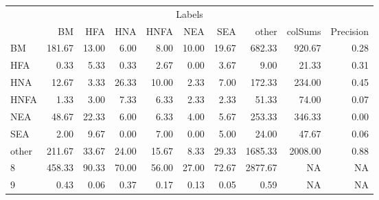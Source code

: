 \begin{table}
\centering\begingroup\fontsize{11}{13}\selectfont

\begin{tabular}{lrrrrrr>{}r|rr}
\toprule
\multicolumn{10}{c}{Labels} \\
\cmidrule(l{3pt}r{3pt}){1-10}
  & BM & HFA & HNA & HNFA & NEA & SEA & other & colSums & Precision\\
\midrule
BM & 181.67 & 13.00 & 6.00 & 8.00 & 10.00 & 19.67 & 682.33 & 920.67 & 0.28\\
HFA & 0.33 & 5.33 & 0.33 & 2.67 & 0.00 & 3.67 & 9.00 & 21.33 & 0.31\\
HNA & 12.67 & 3.33 & 26.33 & 10.00 & 2.33 & 7.00 & 172.33 & 234.00 & 0.45\\
HNFA & 1.33 & 3.00 & 7.33 & 6.33 & 2.33 & 2.33 & 51.33 & 74.00 & 0.07\\
NEA & 48.67 & 22.33 & 6.00 & 6.33 & 4.00 & 5.67 & 253.33 & 346.33 & 0.00\\
\addlinespace
SEA & 2.00 & 9.67 & 0.00 & 7.00 & 0.00 & 5.00 & 24.00 & 47.67 & 0.06\\
other & 211.67 & 33.67 & 24.00 & 15.67 & 8.33 & 29.33 & 1685.33 & 2008.00 & 0.88\\
8 & 458.33 & 90.33 & 70.00 & 56.00 & 27.00 & 72.67 & 2877.67 & NA & NA\\
9 & 0.43 & 0.06 & 0.37 & 0.17 & 0.13 & 0.05 & 0.59 & NA & NA\\
\bottomrule
\end{tabular}
\endgroup{}
\end{table}
